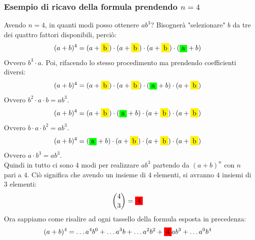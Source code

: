 \documentclass[12pt]{article}
\begin{document}
\subsubsection{Esempio di ricavo della formula prendendo $n = 4$}
Avendo $n=4$, in quanti modi posso ottenere $ab^{3}$? Bisognerà "selezionare" $b$ da tre dei quattro fattori disponibili, perciò:
\[(a + b)^4 = (a + \colorbox{yellow}{b}) \cdot (a + \colorbox{yellow}{b}) \cdot (a + \colorbox{yellow}{b}) \cdot (\colorbox{green}{a} + b)\]
Ovvero $b^3 \cdot a$. Poi, rifacendo lo stesso procedimento ma prendendo coefficienti diversi:
\[(a + b)^4 = (a + \colorbox{yellow}{b}) \cdot (a + \colorbox{yellow}{b}) \cdot (\colorbox{green}{a} + b) \cdot (a + \colorbox{yellow}{b})\]
Ovvero $b^2 \cdot a \cdot b = ab^3$.
\[(a + b)^4 = (a + \colorbox{yellow}{b}) \cdot (\colorbox{green}{a} + b) \cdot (a + \colorbox{yellow}{b}) \cdot (a + \colorbox{yellow}{b})\]
Ovvero $b \cdot a \cdot b^2 = ab^3$.
\[(a + b)^4 = (\colorbox{green}{a} + b) \cdot (a + \colorbox{yellow}{b}) \cdot (a + \colorbox{yellow}{b}) \cdot (a + \colorbox{yellow}{b})\]
Ovvero $a \cdot b^3 = ab^3$. \\
Quindi in tutto ci sono 4 modi per realizzare $ab^3$ partendo da $(a + b)^n$ con $n$ pari a $4$. Ciò significa che avendo un insieme di $4$ elementi, si avranno $4$ insiemi di $3$ elementi:
\[\binom{4}{3} = \colorbox{red}{4}\]
Ora sappiamo come risalire ad ogni tassello della formula esposta in precedenza:
\begin{equation}
    (a + b)^4 = \dots a^4b^0 + \dots a^3b + \dots a^2b^2 + \colorbox{red}{4}ab^3 + \dots a^0b^4 \label{dim:formula_binomio_newton}
\end{equation}
\end{document}
